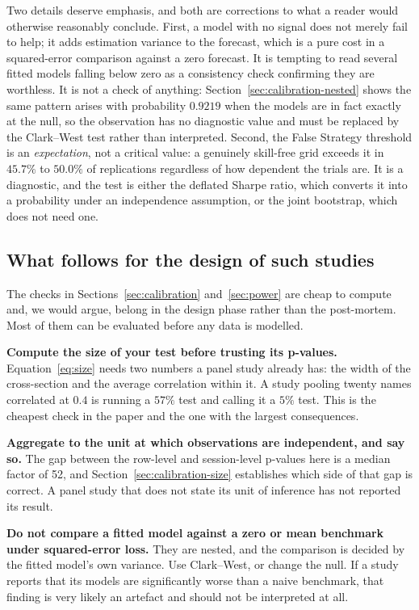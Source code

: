 \documentclass{article}
\theoremstyle{plain}
\theoremstyle{remark}
\begin{document}
Two details deserve emphasis, and both are corrections to what a reader would
otherwise reasonably conclude. First, a model with no signal does not merely
fail to help; it adds estimation variance to the forecast, which is a pure cost
in a squared-error comparison against a zero forecast. It is tempting to read
several fitted models falling below zero as a consistency check confirming they
are worthless. It is not a check of anything:
Section~\ref{sec:calibration-nested} shows the same pattern arises with
probability $0.9219$ when the models are in fact exactly at the null, so the
observation has no diagnostic value and must be replaced by the Clark--West test
rather than interpreted. Second, the False Strategy threshold is an
\emph{expectation}, not a critical value: a genuinely skill-free grid exceeds it
in $45.7\%$ to $50.0\%$ of replications regardless of how dependent the trials
are. It is a diagnostic, and the test is either the deflated Sharpe ratio, which
converts it into a probability under an independence assumption, or the joint
bootstrap, which does not need one.

\subsection{What follows for the design of such studies}

The checks in Sections~\ref{sec:calibration} and~\ref{sec:power} are cheap to
compute and, we would argue, belong in the design phase rather than the
post-mortem. Most of them can be evaluated before any data is modelled.

\textbf{Compute the size of your test before trusting its p-values.}
Equation~\ref{eq:size} needs two numbers a panel study already has: the width of
the cross-section and the average correlation within it. A study pooling twenty
names correlated at $0.4$ is running a $57\%$ test and calling it a $5\%$ test.
This is the cheapest check in the paper and the one with the largest
consequences.

\textbf{Aggregate to the unit at which observations are independent, and say so.}
The gap between the row-level and session-level p-values here is a median factor
of 52, and Section~\ref{sec:calibration-size} establishes which side of that gap
is correct. A panel study that does not state its unit of inference has not
reported its result.

\textbf{Do not compare a fitted model against a zero or mean benchmark under
squared-error loss.} They are nested, and the comparison is decided by the
fitted model's own variance. Use Clark--West, or change the null. If a study
reports that its models are significantly worse than a naive benchmark, that
finding is very likely an artefact and should not be interpreted at all.
\end{document}
